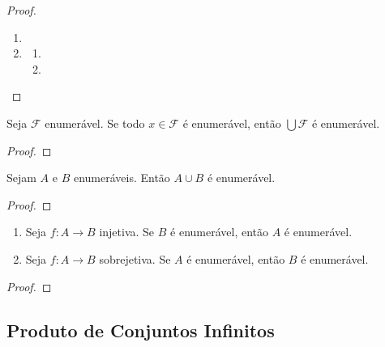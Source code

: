 \begin{proof}
    \leavevmode
        \begin{enumerate}[leftmargin=*, align=left, label=\textbf{(\alph*)}]
            \item \blackproof
            \item 
                \begin{enumerate}[label=\roman*.]
                    \item \blackproof
                    \item \blackproof
                \end{enumerate}
        \end{enumerate}
\end{proof}

\begin{proposition} 
    Seja $\mathcal{F}$ enumerável. Se todo $x \in \mathcal{F}$ é enumerável, então $\bigcup \mathcal{F}$ é enumerável.
\end{proposition}

\begin{proof} 
    \blackproof
\end{proof}

\begin{corollary}
    Sejam $A$ e $B$ enumeráveis. Então $A \cup B$ é enumerável.
\end{corollary}

\begin{proof}
    \blackproof
\end{proof}

\begin{proposition}
    \leavevmode
        \begin{enumerate}[leftmargin=*, align=left, label=\textbf{(\alph*)}]
            \item Seja $f:A \to B$ injetiva. Se $B$ é enumerável, então $A$ é enumerável.
            \item Seja $f:A \to B$ sobrejetiva. Se $A$ é enumerável, então $B$ é enumerável.
        \end{enumerate}
\end{proposition}

\begin{proof}
    \blackproof
\end{proof}

\subsection*{Produto de Conjuntos Infinitos}

